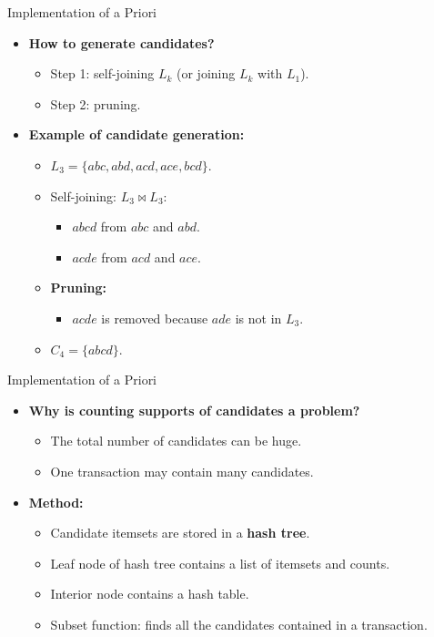 \begin{frame}{Implementation of a Priori}
	\begin{itemize}
		\item \textbf{\color{airforceblue}How to generate candidates?}
		      \begin{itemize}
			      \item Step 1: self-joining $L_k$ (or joining $L_k$ with $L_1$).
			      \item Step 2: pruning.
		      \end{itemize}
		\item \textbf{Example of candidate generation:}
		      \begin{itemize}
			      \item $L_3 = \{abc, abd, acd, ace, bcd\}$.
			      \item Self-joining: $L_3 \bowtie L_3$:
			            \begin{itemize}
				            \item $abcd$ from $abc$ and $abd$.
				            \item $acde$ from $acd$ and $ace$.
			            \end{itemize}
			      \item \textbf{Pruning:}
			            \begin{itemize}
				            \item $acde$ is removed because $ade$ is not in $L_3$.
			            \end{itemize}
			      \item $C_4 = \{abcd\}$.
		      \end{itemize}
	\end{itemize}
\end{frame}

\begin{frame}{Implementation of a Priori}
	\begin{itemize}
		\item \textbf{Why is counting supports of candidates a problem?}
		      \begin{itemize}
			      \item The total number of candidates can be huge.
			      \item One transaction may contain many candidates.
		      \end{itemize}
		\item \textbf{Method:}
		      \begin{itemize}
			      \item Candidate itemsets are stored in a \textbf{hash tree}.
			      \item Leaf node of hash tree contains a list of itemsets and counts.
			      \item Interior node contains a hash table.
			      \item Subset function: finds all the candidates contained in a
			            transaction.
		      \end{itemize}
	\end{itemize}
\end{frame}

